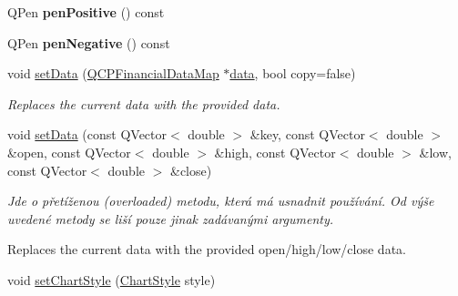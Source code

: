 \begin{DoxyCompactItemize}
\item 
\hypertarget{classQCPFinancial_a544899bde79d06e17ccefcb9926d87ce}{}Q\+Pen {\bfseries pen\+Positive} () const \label{classQCPFinancial_a544899bde79d06e17ccefcb9926d87ce}

\item 
\hypertarget{classQCPFinancial_a557fe911aa04f70c1734c8fa09994148}{}Q\+Pen {\bfseries pen\+Negative} () const \label{classQCPFinancial_a557fe911aa04f70c1734c8fa09994148}

\item 
void \hyperlink{classQCPFinancial_adf12a86082f1e488df6a4e8603f8fd6d}{set\+Data} (\hyperlink{qcustomplot_8h_a745c09823fae0974b50beca9bc3b3d7d}{Q\+C\+P\+Financial\+Data\+Map} $\ast$\hyperlink{classQCPFinancial_a58e05aefa057d16edfcc0334cf81c241}{data}, bool copy=false)
\begin{DoxyCompactList}\small\item\em Replaces the current data with the provided {\itshape data}. \end{DoxyCompactList}\item 
void \hyperlink{classQCPFinancial_a886881339d6447432af55adaad748c3c}{set\+Data} (const Q\+Vector$<$ double $>$ \&key, const Q\+Vector$<$ double $>$ \&open, const Q\+Vector$<$ double $>$ \&high, const Q\+Vector$<$ double $>$ \&low, const Q\+Vector$<$ double $>$ \&close)
\begin{DoxyCompactList}\small\item\em Jde o přetíženou (overloaded) metodu, která má usnadnit používání. Od výše uvedené metody se liší pouze jinak zadávanými argumenty.

Replaces the current data with the provided open/high/low/close data. \end{DoxyCompactList}\item 
\hypertarget{classQCPFinancial_a5a59175d36279d71596e64d7bb65596f}{}void \hyperlink{classQCPFinancial_a5a59175d36279d71596e64d7bb65596f}{set\+Chart\+Style} (\hyperlink{classQCPFinancial_a0f800e21ee98d646dfc6f8f89d10ebfb}{Chart\+Style} style)\label{classQCPFinancial_a5a59175d36279d71596e64d7bb65596f}


\end{DoxyCompactItemize}
